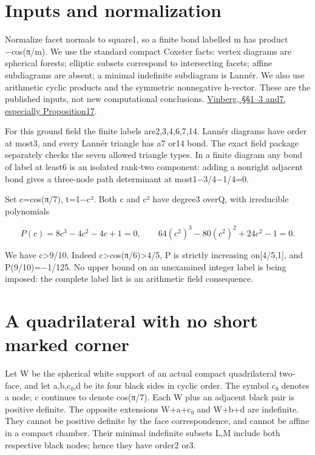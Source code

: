 \documentclass[
  10pt,
]{report}
\begin{document}
\section{Inputs and normalization}\label{inputs-and-normalization}

Normalize facet normals to square1, so a finite bond labelled m has
product −cos(π/m). We use the standard compact Coxeter facts: vertex
diagrams are spherical forests; elliptic subsets correspond to
intersecting facets; affine subdiagrams are absent; a minimal indefinite
subdiagram is Lannér. We also use arithmetic cyclic products and the
symmetric nonnegative h-vector. These are the published inputs, not new
computational conclusions.
\href{https://www.mathnet.ru/php/getFT.phtml?jrnid=mmo&option_lang=rus&paperid=444&what=fullt}{Vinberg,
§§1--3 and7, especially Proposition17}.

For this ground field the finite labels are2,3,4,6,7,14. Lannér diagrams
have order at most3, and every Lannér triangle has a7 or14 bond. The
exact field package separately checks the seven allowed triangle types.
In a finite diagram any bond of label at least6 is an isolated rank-two
component: adding a nonright adjacent bond gives a three-node path
determinant at most1−3/4−1/4=0.

Set c=cos(π/7), t=1−c². Both c and c² have degree3 overQ, with
irreducible polynomials

\[
 P(c)=8c^3-4c^2-4c+1=0,
 \qquad 64(c^2)^3-80(c^2)^2+24c^2-1=0.
\]

We have c\textgreater9/10. Indeed c\textgreater cos(π/6)\textgreater4/5,
P is strictly increasing on{[}4/5,1{]}, and P(9/10)=−1/125. No upper
bound on an unexamined integer label is being imposed: the complete
label list is an arithmetic field consequence.

\section{A quadrilateral with no short marked
corner}\label{a-quadrilateral-with-no-short-marked-corner}

Let W be the spherical white support of an actual compact quadrilateral
two-face, and let a,b,c₀,d be its four black sides in cyclic order. The
symbol c₀ denotes a node; c continues to denote cos(π/7). Each W plus an
adjacent black pair is positive definite. The opposite extensions W+a+c₀
and W+b+d are indefinite. They cannot be positive definite by the face
correspondence, and cannot be affine in a compact chamber. Their minimal
indefinite subsets L,M include both respective black nodes; hence they
have order2 or3.
\end{document}
